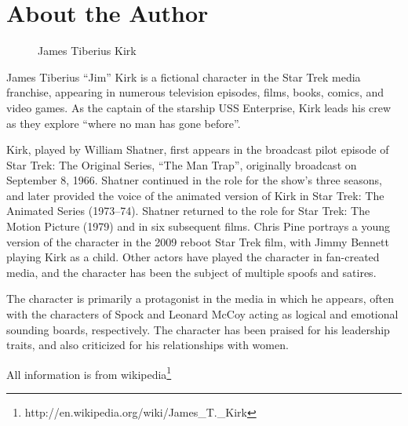 \chapter{About the Author}

\begin{figure}[h]
  \centering
  \caption{James Tiberius Kirk}
\end{figure}

James Tiberius ``Jim'' Kirk is a fictional character in the Star Trek media franchise, appearing in numerous television episodes, films, books, comics, and video games. As the captain of the starship USS Enterprise, Kirk leads his crew as they explore ``where no man has gone before''.

Kirk, played by William Shatner, first appears in the broadcast pilot episode of Star Trek: The Original Series, ``The Man Trap'', originally broadcast on September 8, 1966. Shatner continued in the role for the show's three seasons, and later provided the voice of the animated version of Kirk in Star Trek: The Animated Series (1973–74). Shatner returned to the role for Star Trek: The Motion Picture (1979) and in six subsequent films. Chris Pine portrays a young version of the character in the 2009 reboot Star Trek film, with Jimmy Bennett playing Kirk as a child. Other actors have played the character in fan-created media, and the character has been the subject of multiple spoofs and satires.

The character is primarily a protagonist in the media in which he appears, often with the characters of Spock and Leonard McCoy acting as logical and emotional sounding boards, respectively. The character has been praised for his leadership traits, and also criticized for his relationships with women.

All information is from wikipedia\footnote{http://en.wikipedia.org/wiki/James\_T.\_Kirk}
